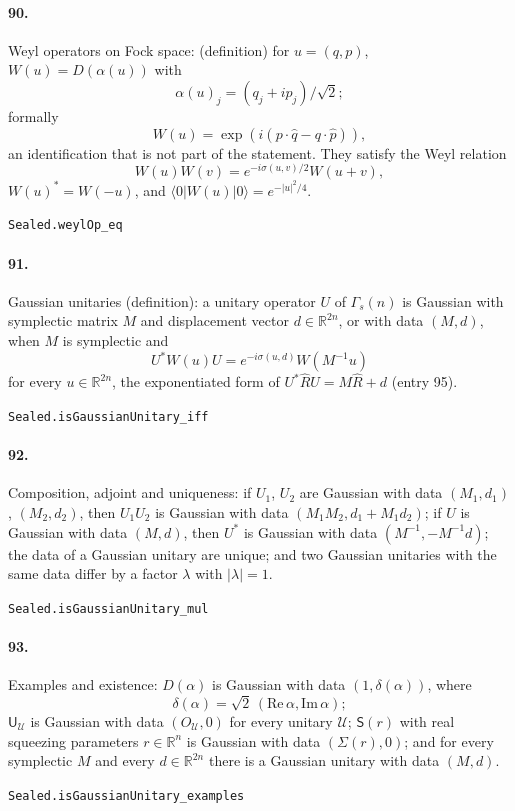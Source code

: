 \documentclass[11pt]{article}
\begin{document}
\paragraph{90.} Weyl operators on Fock space: (definition) for $u = (q, p)$, $W(u) = D(\alpha(u))$ with \[\alpha(u)_j = (q_j + i p_j)/\sqrt2;\] formally \[W(u) = \exp(i(p \cdot \hat q - q \cdot \hat p)),\] an identification that is not part of the statement. They satisfy the Weyl relation \[W(u) W(v) = e^{-i\sigma(u, v)/2} W(u + v),\] $W(u)^* = W(-u)$, and $\langle 0|W(u)|0\rangle = e^{-|u|^2/4}$.\par{\footnotesize\texttt{Sealed.weylOp\_eq}}

\paragraph{91.} Gaussian unitaries (definition): a unitary operator $U$ of $\Gamma_s(n)$ is Gaussian with symplectic matrix $M$ and displacement vector $d \in \mathbb R^{2n}$, or with data $(M, d)$, when $M$ is symplectic and \[U^* W(u) U = e^{-i\sigma(u, d)} W(M^{-1}u)\] for every $u \in \mathbb R^{2n}$, the exponentiated form of $U^* \hat R U = M \hat R + d$ (entry 95).\par{\footnotesize\texttt{Sealed.isGaussianUnitary\_iff}}

\paragraph{92.} Composition, adjoint and uniqueness: if $U_1$, $U_2$ are Gaussian with data $(M_1, d_1)$, $(M_2, d_2)$, then $U_1 U_2$ is Gaussian with data $(M_1 M_2, d_1 + M_1 d_2)$; if $U$ is Gaussian with data $(M, d)$, then $U^*$ is Gaussian with data $(M^{-1}, -M^{-1} d)$; the data of a Gaussian unitary are unique; and two Gaussian unitaries with the same data differ by a factor $\lambda$ with $|\lambda| = 1$.\par{\footnotesize\texttt{Sealed.isGaussianUnitary\_mul}}

\paragraph{93.} Examples and existence: $D(\alpha)$ is Gaussian with data $(1, \delta(\alpha))$, where \[\delta(\alpha) = \sqrt2\, (\mathrm{Re}\, \alpha, \mathrm{Im}\, \alpha);\] $\mathsf U_{\mathcal U}$ is Gaussian with data $(O_{\mathcal U}, 0)$ for every unitary $\mathcal U$; $\mathsf S(r)$ with real squeezing parameters $r \in \mathbb R^n$ is Gaussian with data $(\Sigma(r), 0)$; and for every symplectic $M$ and every $d \in \mathbb R^{2n}$ there is a Gaussian unitary with data $(M, d)$.\par{\footnotesize\texttt{Sealed.isGaussianUnitary\_examples}}
\end{document}
